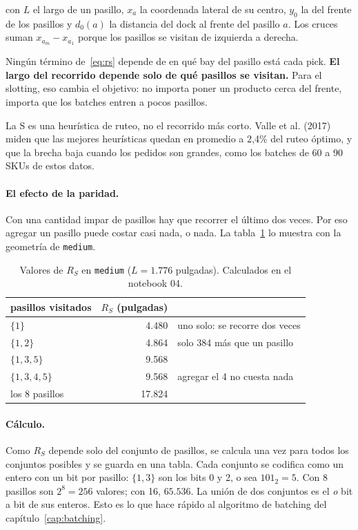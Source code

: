\documentclass[11pt,a4paper,oneside]{report}
\newcommand{\code}[1]{\texttt{\small #1}}
\newcommand{\RS}{R_S}
\begin{document}
con $L$ el largo de un pasillo, $x_a$ la coordenada lateral de su centro, $y_0$ la del frente
de los pasillos y $d_0(a)$ la distancia del dock al frente del pasillo $a$. Los cruces suman
$x_{a_m} - x_{a_1}$ porque los pasillos se visitan de izquierda a derecha.

\begin{idea}
Ningún término de~\eqref{eq:rs} depende de en qué bay del pasillo está cada pick. \textbf{El
largo del recorrido depende solo de qué pasillos se visitan.} Para el slotting, eso cambia el
objetivo: no importa poner un producto cerca del frente, importa que los batches entren a pocos
pasillos.
\end{idea}

La S es una heurística de ruteo, no el recorrido más corto. Valle et al. (2017) miden que
las mejores heurísticas quedan en promedio a 2,4\% del ruteo óptimo, y que la brecha baja
cuando los pedidos son grandes, como los batches de 60 a 90 SKUs de estos datos.

\paragraph{El efecto de la paridad.} Con una cantidad impar de pasillos hay que recorrer el
último dos veces. Por eso agregar un pasillo puede costar casi nada, o nada. La
tabla~\ref{tab:paridad} lo muestra con la geometría de \code{medium}.

\begin{table}[ht]
\centering\small
\begin{tabular}{@{}lrl@{}}
\toprule
pasillos visitados & $\RS$ (pulgadas) & \\
\midrule
$\{1\}$ & 4.480 & uno solo: se recorre dos veces \\
$\{1, 2\}$ & 4.864 & solo 384 más que un pasillo \\
$\{1, 3, 5\}$ & 9.568 & \\
$\{1, 3, 4, 5\}$ & 9.568 & agregar el 4 no cuesta nada \\
los 8 pasillos & 17.824 & \\
\bottomrule
\end{tabular}
\caption{Valores de $\RS$ en \code{medium} ($L = 1.776$ pulgadas). Calculados en el notebook 04.}
\label{tab:paridad}
\end{table}

\paragraph{Cálculo.} Como $\RS$ depende solo del conjunto de pasillos, se calcula una vez para
todos los conjuntos posibles y se guarda en una tabla. Cada conjunto se codifica como un entero
con un bit por pasillo: $\{1, 3\}$ son los bits 0 y 2, o sea $101_2 = 5$. Con 8 pasillos son
$2^8 = 256$ valores; con 16, $65.536$. La unión de dos conjuntos es el \emph{o} bit a bit de
sus enteros. Esto es lo que hace rápido al algoritmo de batching del
capítulo~\ref{cap:batching}.
\end{document}
